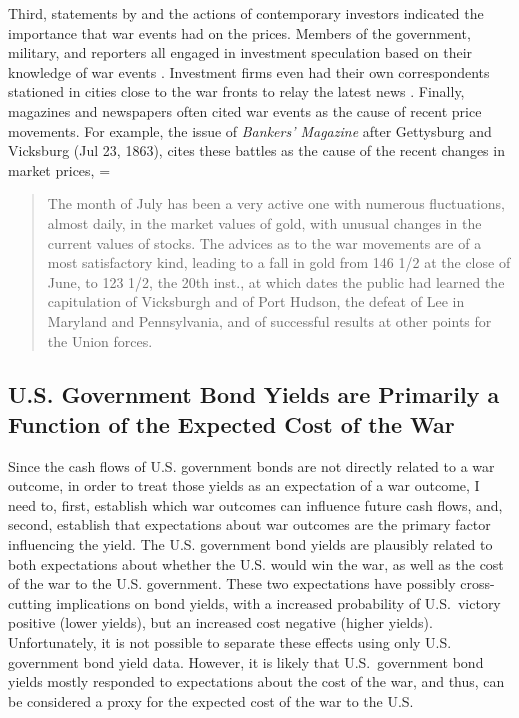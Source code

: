 Third, statements by and the actions of contemporary investors indicated the importance that war events had on the prices. %
Members of the government, military, and reporters all engaged in investment speculation based on their knowledge of war events \parencites[5-7]{Cornwallis1879}{Mitchell1903}[][1004]{WillardGuinnaneEtAl1996}.
Investment firms even had their own correspondents stationed in cities close to the war fronts to relay the latest news \parencites[5-7]{Cornwallis1879}. %
Finally, magazines and newspapers often cited war events as the cause of recent price movements. %
For example, the issue of \textit{Bankers' Magazine} after Gettysburg and Vicksburg (Jul 23, 1863), cites these battles as the cause of the recent changes in market prices,
=\begin{quote}
  The month of July has been a very active one with numerous fluctuations, almost daily, in the market values of gold, with unusual changes in the current values of stocks. %
  The advices as to the war movements are of a most satisfactory kind, leading to a fall in gold from 146 1/2 at the close of June, to 123 1/2, the 20th inst., at which dates the public had learned the  capitulation of Vicksburgh and of Port Hudson, the defeat of Lee in  Maryland and Pennsylvania, and of successful results at other points  for the Union forces. %
\parencite[159]{BankersMagazine1864}
\end{quote}



\subsection{U.S. Government Bond Yields are Primarily a Function of the Expected Cost of the War}
\label{sec:u.s.-governm-inter}

Since the cash flows of U.S. government bonds are not directly related to a war outcome, in order to treat those yields as an expectation of a war outcome, I need to, first, establish which war outcomes can influence future cash flows, and, second, establish that expectations about war outcomes are the primary factor influencing the yield.
The U.S. government bond yields are plausibly related to both expectations about whether the U.S. would win the war, as well as the cost of the war to the U.S. government.
These two expectations have possibly cross-cutting implications on bond yields, with a increased probability of U.S.\ victory positive (lower yields), but an increased cost negative (higher yields).
Unfortunately, it is not possible to separate these effects using only U.S. government bond yield data.
However, it is likely that U.S.\ government bond yields mostly responded to expectations about the cost of the war, and thus, can be considered a proxy for the expected cost of the war to the U.S.


